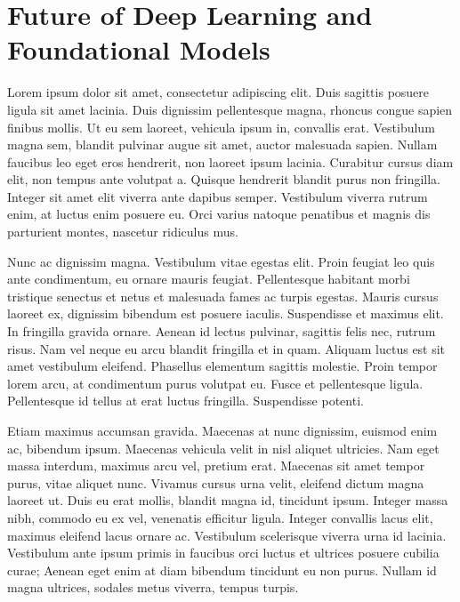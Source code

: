 \documentclass[
  letterpaper,
  DIV=11,
  numbers=noendperiod]{scrreprt}
\begin{document}
\chapter{Future of Deep Learning and Foundational
Models}\label{future-of-deep-learning-and-foundational-models}

Lorem ipsum dolor sit amet, consectetur adipiscing elit. Duis sagittis
posuere ligula sit amet lacinia. Duis dignissim pellentesque magna,
rhoncus congue sapien finibus mollis. Ut eu sem laoreet, vehicula ipsum
in, convallis erat. Vestibulum magna sem, blandit pulvinar augue sit
amet, auctor malesuada sapien. Nullam faucibus leo eget eros hendrerit,
non laoreet ipsum lacinia. Curabitur cursus diam elit, non tempus ante
volutpat a. Quisque hendrerit blandit purus non fringilla. Integer sit
amet elit viverra ante dapibus semper. Vestibulum viverra rutrum enim,
at luctus enim posuere eu. Orci varius natoque penatibus et magnis dis
parturient montes, nascetur ridiculus mus.

Nunc ac dignissim magna. Vestibulum vitae egestas elit. Proin feugiat
leo quis ante condimentum, eu ornare mauris feugiat. Pellentesque
habitant morbi tristique senectus et netus et malesuada fames ac turpis
egestas. Mauris cursus laoreet ex, dignissim bibendum est posuere
iaculis. Suspendisse et maximus elit. In fringilla gravida ornare.
Aenean id lectus pulvinar, sagittis felis nec, rutrum risus. Nam vel
neque eu arcu blandit fringilla et in quam. Aliquam luctus est sit amet
vestibulum eleifend. Phasellus elementum sagittis molestie. Proin tempor
lorem arcu, at condimentum purus volutpat eu. Fusce et pellentesque
ligula. Pellentesque id tellus at erat luctus fringilla. Suspendisse
potenti.

Etiam maximus accumsan gravida. Maecenas at nunc dignissim, euismod enim
ac, bibendum ipsum. Maecenas vehicula velit in nisl aliquet ultricies.
Nam eget massa interdum, maximus arcu vel, pretium erat. Maecenas sit
amet tempor purus, vitae aliquet nunc. Vivamus cursus urna velit,
eleifend dictum magna laoreet ut. Duis eu erat mollis, blandit magna id,
tincidunt ipsum. Integer massa nibh, commodo eu ex vel, venenatis
efficitur ligula. Integer convallis lacus elit, maximus eleifend lacus
ornare ac. Vestibulum scelerisque viverra urna id lacinia. Vestibulum
ante ipsum primis in faucibus orci luctus et ultrices posuere cubilia
curae; Aenean eget enim at diam bibendum tincidunt eu non purus. Nullam
id magna ultrices, sodales metus viverra, tempus turpis.
\end{document}
